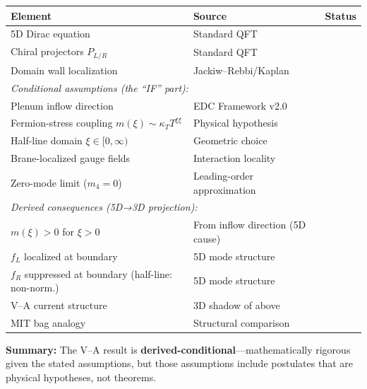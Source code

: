 \begin{tcolorbox}[colback=green!5, colframe=green!50!black,
    title=\textbf{Epistemic Audit}]
\begin{center}
\small
\begin{tabular}{lll}
\toprule
\textbf{Element} & \textbf{Source} & \textbf{Status} \\
\midrule
5D Dirac equation & Standard QFT & \tagBL{} \\
Chiral projectors $P_{L/R}$ & Standard QFT & \tagBL{} \\
Domain wall localization & Jackiw--Rebbi/Kaplan~\cite{JackiwRebbi1976,Kaplan1992} & \tagBL{} \\
\midrule
\multicolumn{3}{l}{\textit{Conditional assumptions (the ``IF'' part):}} \\
Plenum inflow direction & EDC Framework v2.0 & \tagP{} \\
Fermion-stress coupling $m(\xi) \sim \kappa_T T^{\xi\xi}$ & Physical hypothesis & \tagP{} \\
Half-line domain $\xi \in [0, \infty)$ & Geometric choice & \tagP{} \\
Brane-localized gauge fields & Interaction locality & \tagP{} \\
Zero-mode limit ($m_4 = 0$) & Leading-order approximation & \tagP{} \\
\midrule
\multicolumn{3}{l}{\textit{Derived consequences (5D→3D projection):}} \\
$m(\xi) > 0$ for $\xi > 0$ & From inflow direction (5D cause) & \tagDc{} \\
$f_L$ localized at boundary & 5D mode structure & \tagDc{} \\
$f_R$ suppressed at boundary (half-line: non-norm.) & 5D mode structure & \tagDc{} \\
V–A current structure & 3D shadow of above & \tagDc{} \\
\midrule
MIT bag analogy & Structural comparison & \tagI{} \\
\bottomrule
\end{tabular}
\end{center}
\medskip
\noindent\textbf{Summary:} The V--A result is \textbf{derived-conditional}---mathematically
rigorous given the stated assumptions, but those assumptions include postulates \tagP{}
that are physical hypotheses, not theorems.
\end{tcolorbox}

